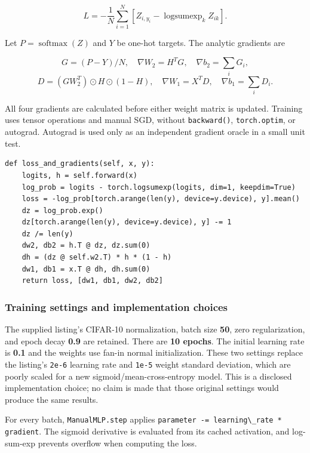 \documentclass[10pt,a4paper]{article}
\newcommand{\passthrough}[1]{#1}
\begin{document}
\[L=-\frac{1}{N}\sum_{i=1}^{N}\left[Z_{i,y_i}-\operatorname{logsumexp}_k Z_{ik}\right].\]

Let \(P=\operatorname{softmax}(Z)\) and \(Y\) be one-hot targets. The analytic gradients are

\[G=(P-Y)/N,\quad \nabla W_2=H^T G,\quad \nabla b_2=\sum_i G_i,\] \[D=(GW_2^T)\odot H\odot(1-H),\quad \nabla W_1=X^T D,\quad \nabla b_1=\sum_i D_i.\]

All four gradients are calculated before either weight matrix is updated. Training uses tensor operations and manual SGD, without \passthrough{\lstinline!backward()!}, \passthrough{\lstinline!torch.optim!}, or autograd. Autograd is used only as an independent gradient oracle in a small unit test.

\par\noindent\begin{minipage}{\linewidth}
\begin{lstlisting}
def loss_and_gradients(self, x, y):
    logits, h = self.forward(x)
    log_prob = logits - torch.logsumexp(logits, dim=1, keepdim=True)
    loss = -log_prob[torch.arange(len(y), device=y.device), y].mean()
    dz = log_prob.exp()
    dz[torch.arange(len(y), device=y.device), y] -= 1
    dz /= len(y)
    dw2, db2 = h.T @ dz, dz.sum(0)
    dh = (dz @ self.w2.T) * h * (1 - h)
    dw1, db1 = x.T @ dh, dh.sum(0)
    return loss, [dw1, db1, dw2, db2]
\end{lstlisting}
\end{minipage}\par

\subsubsection{Training settings and implementation choices}\label{training-settings-and-implementation-choices}

The supplied listing's CIFAR-10 normalization, batch size \textbf{50}, zero regularization, and epoch decay \textbf{0.9} are retained. There are \textbf{10 epochs}. The initial learning rate is \textbf{0.1} and the weights use fan-in normal initialization. These two settings replace the listing's \passthrough{\lstinline!2e-6!} learning rate and \passthrough{\lstinline!1e-5!} weight standard deviation, which are poorly scaled for a new sigmoid/mean-cross-entropy model. This is a disclosed implementation choice; no claim is made that those original settings would produce the same results.

For every batch, \passthrough{\lstinline!ManualMLP.step!} applies \passthrough{\lstinline!parameter -= learning\_rate * gradient!}. The sigmoid derivative is evaluated from its cached activation, and log-sum-exp prevents overflow when computing the loss.
\end{document}
